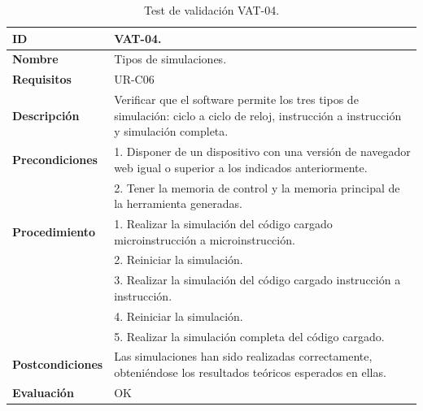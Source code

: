\begin{center}
\begin{table}[htbp]
\centering
\caption{Test de validación VAT-04.}
\begin{tabular}{@{}p{2.5cm} p{13cm}@{}} 
\toprule
\textbf{ID} 					& VAT-04. \\
\midrule
\textbf{Nombre} 				& Tipos de simulaciones. \\
\midrule
\textbf{Requisitos} 		& UR-C06\\
\midrule
\textbf{Descripción} 		& Verificar que el \gls{software} permite los tres tipos de simulación: ciclo a ciclo de reloj, instrucción a instrucción y simulación completa. \\
\midrule
\textbf{Precondiciones}		& 1. Disponer de un dispositivo con una versión de navegador web igual o superior a los indicados anteriormente. \\
											& 2. Tener la memoria de control y la memoria principal de la herramienta generadas. \\
\midrule
\textbf{Procedimiento}		& 1. Realizar la simulación del código cargado microinstrucción a microinstrucción.\\
											& 2. Reiniciar la simulación.\\
											& 3. Realizar la simulación del código cargado instrucción a instrucción.\\
											& 4. Reiniciar la simulación.\\
											& 5. Realizar la simulación completa del código cargado. \\
\midrule
\textbf{Postcondiciones} 		&  Las simulaciones han sido realizadas correctamente, obteniéndose los resultados teóricos esperados en ellas.\\
\midrule
\textbf{Evaluación} 			& OK \\
\bottomrule
\end{tabular}
\label{tab:vat-04}
\end{table}
\end{center}

